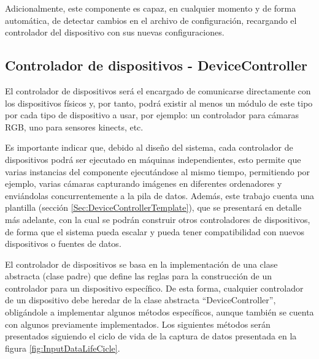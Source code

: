             Adicionalmente, este componente es capaz, en cualquier momento y de forma automática, de detectar cambios en el archivo de configuración, recargando el controlador del dispositivo con sus nuevas configuraciones. 
    
    \subsection{Controlador de dispositivos - DeviceController}
    \label{sub:DeviceController}
        El controlador de dispositivos será el encargado de comunicarse directamente con los dispositivos físicos y, por tanto, podrá existir al menos un módulo de este tipo por cada tipo de dispositivo a usar, por ejemplo: un controlador para cámaras RGB, uno para sensores kinects, etc.
        
        Es importante indicar que, debido al diseño del sistema, cada controlador de dispositivos podrá ser ejecutado en máquinas independientes, esto permite que varias instancias del componente ejecutándose al mismo tiempo, permitiendo por ejemplo, varias cámaras capturando imágenes en diferentes ordenadores y enviándolas concurrentemente a la pila de datos. Además, este trabajo cuenta una plantilla (sección \ref{Sec:DeviceControllerTemplate}), que se presentará en detalle más adelante, con la cual se podrán construir otros controladores de dispositivos, de forma que el sistema pueda escalar y pueda tener compatibilidad con nuevos dispositivos o fuentes de datos.
        
        El controlador de dispositivos se basa en la implementación de una clase abstracta (clase padre) que define las reglas para la construcción de un controlador para un dispositivo específico. De esta forma, cualquier controlador de un dispositivo debe heredar de la clase abstracta ``DeviceController'', obligándole a implementar algunos métodos específicos, aunque también se cuenta con algunos previamente implementados. Los siguientes métodos serán presentados siguiendo el ciclo de vida de la captura de datos presentada en la figura \ref{fig:InputDataLifeCicle}. 
    
